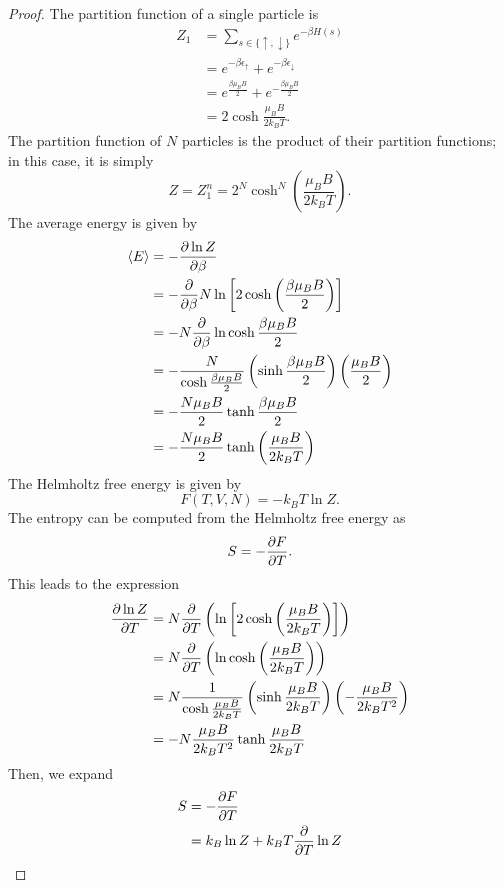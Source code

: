 \begin{proof}
	The partition function of a single particle is
	\begin{align*}
		Z_1 &= \sum_{s \in \{\uparrow, \downarrow\} } e^{-\beta H(s)} \\
		  &= e^{-\beta \epsilon_\uparrow} + e^{-\beta\epsilon_\downarrow} \\
		  &= e^{\frac{\beta \mu_B B}{2}} + e^{-\frac{\beta \mu_B B}{2}} \\
		  &= 2\cosh \frac{\mu_B B}{2k_B T}
	.\end{align*}
	The partition function of $N$ particles is the product of their partition functions; in this case, it is simply
	\[
	Z=Z_1^n = 2^N \cosh^N \left( \frac{\mu_B B}{2 k_B T} \right) 
	.\] 
	The average energy is given by
	\begin{align*}
		\langle E \rangle &= - \pdv{\ln Z}{\beta} \\
				  &= -\pdv{\beta}N\ln\left[ 2\cosh \left( \frac{\beta \mu_B B}{2} \right)  \right]   \\
				  &= -N \pdv{\beta} \ln \cosh \frac{\beta \mu_B B}{2} \\
				  &= -\frac{N}{\cosh \frac{\beta\mu_B B}{2}}\left(\sinh \frac{\beta \mu_B B}{2}\right)\left( \frac{\mu_B B}{2} \right)  \\
				  &=  -\frac{N\mu_B B}{2}\tanh \frac{\beta \mu_B B}{2} \\
				  &= -\frac{N\mu_B B}{2}\tanh\left( \frac{\mu_B B}{2k_B T} \right) 
	\end{align*}
	The Helmholtz free energy is given by
	\[
	F(T,V,N) = -k_B T \ln Z
	.\] 
	The entropy can be computed from the Helmholtz free energy as
	\[
		S = -\pdv{F}{T}
	.\] 
	This leads to the expression
	\begin{align*}
		\pdv{\ln Z}{T} &= N\pdv{T}\left( \ln\left[ 2 \cosh \left( \frac{\mu_B B}{2k_B T} \right)  \right]  \right)  \\
			       &=  N\pdv{T} \left( \ln \cosh \left( \frac{\mu_B B}{2k_B T} \right)  \right)  \\
			       &= N\frac{1}{\cosh \frac{\mu_B B}{2k_B T}} \left(\sinh \frac{\mu_B B}{2k_B T}\right)\left( -\frac{\mu_B B}{2k_B T^2} \right) \\
			       &= -N\frac{\mu_B B}{2k_B T^2}\tanh \frac{\mu_B B}{2 k_B T}
	\end{align*}
	Then, we expand
	\begin{align*}
		S &=  -\pdv{F}{T} \\
		  &= k_B \ln Z +k_B T \pdv{T}\ln Z \\

\end{align*}
\end{proof}
